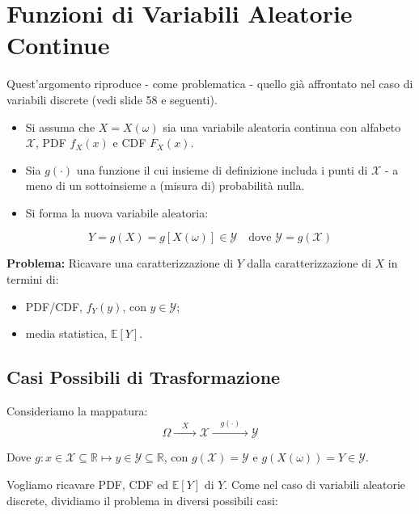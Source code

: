 \section{Funzioni di Variabili Aleatorie Continue}

Quest'argomento riproduce - come problematica - quello già affrontato nel caso di variabili discrete (vedi slide 58 e seguenti).

\begin{itemize}
    \item Si assuma che $X = X(\omega)$ sia una variabile aleatoria continua con alfabeto $\mathcal{X}$, PDF $f_X(x)$ e CDF $F_X(x)$.
    \item Sia $g(\cdot)$ una funzione il cui insieme di definizione includa i punti di $\mathcal{X}$ - a meno di un sottoinsieme a (misura di) probabilità nulla.
    \item Si forma la nuova variabile aleatoria:
\end{itemize}

\begin{equation}
Y = g(X) = g[X(\omega)] \in \mathcal{Y} \quad \text{dove } \mathcal{Y} = g(\mathcal{X})
\end{equation}

\textbf{Problema:} Ricavare una caratterizzazione di $Y$ dalla caratterizzazione di $X$ in termini di:
\begin{itemize}
    \item PDF/CDF, $f_Y(y)$, con $y \in \mathcal{Y}$;
    \item media statistica, $\mathbb{E}[Y]$.
\end{itemize}

\subsection{Casi Possibili di Trasformazione}

Consideriamo la mappatura:
\begin{equation}
\Omega \xrightarrow{\quad X \quad} \mathcal{X} \xrightarrow{\quad g(\cdot) \quad} \mathcal{Y}
\end{equation}

Dove $g : x \in \mathcal{X} \subseteq \mathbb{R} \longmapsto y \in \mathcal{Y} \subseteq \mathbb{R}$, con $g(\mathcal{X}) = \mathcal{Y}$ e $g(X(\omega)) = Y \in \mathcal{Y}$.

Vogliamo ricavare PDF, CDF ed $\mathbb{E}[Y]$ di $Y$. Come nel caso di variabili aleatorie discrete, dividiamo il problema in diversi possibili casi:

